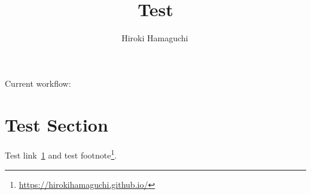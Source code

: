 \documentclass[11pt,dvipdfmx]{article}
\begin{document}
\title{Test}

\author[1]{Hiroki Hamaguchi\,}
\date{}

\maketitle

Current workflow: 

\section{Test Section}\label{sec:test_section}

Test link~\ref{sec:test_section} and test footnote\footnote{\url{https://hirokihamaguchi.github.io/}}.\\
\end{document}
